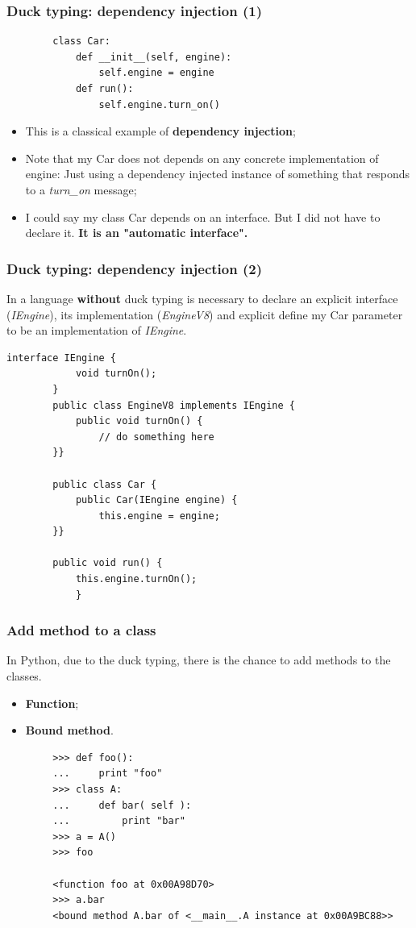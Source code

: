 \documentclass[xcolor ={table,usenames,dvipsnames}]{beamer}
\theoremstyle{definition}
\begin{document}
	\begin{frame}[fragile]
		\frametitle{Duck typing: dependency injection (1)}
		\begin{lstlisting}
		class Car:
			def __init__(self, engine):
				self.engine = engine
			def run():
				self.engine.turn_on()			
		\end{lstlisting}
		
		\begin{itemize}
			\item This is a classical example of \textbf{dependency injection};
			\item Note that my Car does not depends on any concrete implementation of engine: Just using a dependency injected instance of something that responds to a \textit{turn\_on} message;
			\item I could say my class Car depends on an interface. But I did not have to declare it. \textbf{It is an "automatic interface".}\\
		\end{itemize}	
	\end{frame}

	\begin{frame}[fragile]
		\frametitle{Duck typing: dependency injection (2)}
		In a language \textbf{without} duck typing is necessary to declare an explicit interface (\textit{IEngine}), its implementation (\textit{EngineV8}) and explicit define my Car parameter to be an implementation of \textit{IEngine}.	
		
		\begin{lstlisting}[basicstyle=\fontsize{2}{4}\selectfont\ttfamily\tiny]
		interface IEngine {
			void turnOn();
		}
		public class EngineV8 implements IEngine {
			public void turnOn() {
				// do something here
		}}
		
		public class Car {
			public Car(IEngine engine) {
				this.engine = engine;
		}}
		
		public void run() {
			this.engine.turnOn();
			}
		\end{lstlisting}
	\end{frame}

	\begin{frame}[fragile]
		\frametitle{Add method to a class}
			In Python, due to the duck typing, there is the chance to add methods to the classes. 
		\begin{itemize}
			\item \textbf{Function};
			\item \textbf{Bound method}.
		\end{itemize}
	
		\begin{lstlisting}
		>>> def foo():
		...     print "foo"
		>>> class A:
		...     def bar( self ):
		...         print "bar"
		>>> a = A()
		>>> foo
		
		<function foo at 0x00A98D70>
		>>> a.bar
		<bound method A.bar of <__main__.A instance at 0x00A9BC88>>
		\end{lstlisting}
	\end{frame}
\end{document}
